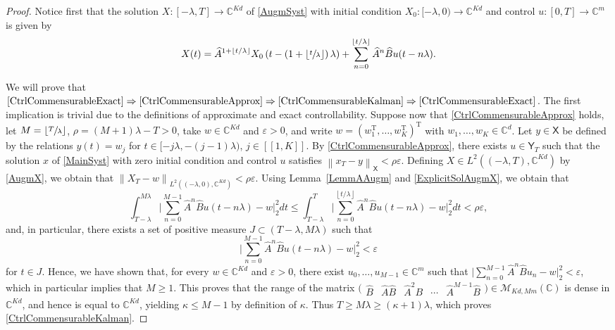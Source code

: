 \documentclass[JEP,XML,SOM,Unicode]{cedram}
\newcommand\implique{\mathchoice{\Longrightarrow}{\Rightarrow}{\Rightarrow}{\Rightarrow}}
\newcommand{\llbracket}{[\![}
\newcommand{\rrbracket}{]\!]}
\theoremstyle{plain}
\theoremstyle{definition}
\newcommand{\transp}{{\scriptscriptstyle\mathrm{T}}}
\newcommand{\norm}[1]{\left\lVert #1\right\lVert}
\newcommand{\floor}[1]{\left\lfloor #1 \right\rfloor}
\newcommand{\babs}[1]{\bigl\lvert #1\bigr \rvert}
\newcommand{\bgabs}[1]{\biggl\lvert #1\biggr \rvert}
\begin{document}
\begin{proof}
Notice first that the solution $X: [-\lambda, T] \to \mathbb C^{Kd}$ of \eqref{AugmSyst} with initial condition $X_0: [-\lambda, 0) \to \mathbb C^{Kd}$ and control $u: [0, T] \to \mathbb C^m$ is given by
\begin{equation}
\label{ExplicitSolAugmX}
X(t) = \widehat A^{1 + \floor{t/\lambda}} X_0\left(t - \left(1 + \floor{\sfrac{t}{\lambda}}\right) \lambda\right) + \sum_{n=0}^{\floor{t/\lambda}} \widehat A^n \widehat B u(t - n\lambda).
\end{equation}

We will prove that $\eqref{CtrlCommensurableExact}\implique \eqref{CtrlCommensurableApprox}\implique \eqref{CtrlCommensurableKalman}\implique\eqref{CtrlCommensurableExact}$. The first implication is trivial due to the definitions of approximate and exact controllability. Suppose now that \eqref{CtrlCommensurableApprox} holds, let $M = \floor{\sfrac{T}{\lambda}}$, $\rho = (M+1)\lambda - T > 0$, take $w \in \mathbb C^{Kd}$ and $\varepsilon > 0$, and write $w = \left(w_1^\transp, \dots, w_K^\transp\right)^\transp$ with $w_1, \dots, w_K \in \mathbb C^d$. Let $y \in \mathsf X$ be defined by the relations $y(t) = w_j$ for $t \in [-j\lambda, -(j-1)\lambda)$, $j \in \llbracket 1, K\rrbracket$. By \eqref{CtrlCommensurableApprox}, there exists $u \in \mathsf Y_T$ such that the solution $x$ of \eqref{MainSyst} with zero initial condition and control $u$ satisfies $\norm{x_T - y}_{\mathsf X} < \rho\varepsilon$. Defining $X \in L^2((-\lambda, T), \mathbb C^{Kd})$ by \eqref{AugmX}, we obtain that $\norm{X_T - w}_{L^2((-\lambda, 0), \mathbb C^{Kd})} < \rho\varepsilon$. Using Lemma~\ref{LemmAAugm} and \eqref{ExplicitSolAugmX}, we obtain that
\[
\int_{T - \lambda}^{M\lambda} \bgabs{\sum_{n=0}^{M-1} \widehat A^n \widehat B u(t - n\lambda) - w}_{2}^2 dt \leq \int_{T - \lambda}^T \bgabs{\sum_{n=0}^{\floor{t/\lambda}} \widehat A^n \widehat B u(t - n\lambda) - w}_{2}^2 dt < \rho\varepsilon,
\]
and, in particular, there exists a set of positive measure $J \subset (T - \lambda, M\lambda)$ such that
\[
\bgabs{\sum_{n=0}^{M-1} \widehat A^n \widehat B u(t - n\lambda) - w}_{2}^2 < \varepsilon
\]
for $t \in J$. Hence, we have shown that, for every $w \in \mathbb C^{K d}$ and $\varepsilon > 0$, there exist $u_0, \dots, u_{M-1} \in \mathbb C^m$ such that $\babs{\sum_{n=0}^{M-1} \widehat A^n \widehat B u_n - w}_2^2 < \varepsilon$, which in particular implies that $M \geq 1$. This proves that the range of the matrix $\bigl(\begin{matrix}\widehat B & \widehat A \widehat B & \widehat A^2 B & \cdots & \widehat A^{M-1} \widehat B\end{matrix}\bigr) \in \mathcal M_{Kd, M m}(\mathbb C)$ is dense in $\mathbb C^{Kd}$, and hence is equal to $\mathbb C^{Kd}$, yielding $\kappa \leq M - 1$ by definition of $\kappa$. Thus $T \geq M \lambda \geq (\kappa + 1)\lambda$, which proves \eqref{CtrlCommensurableKalman}.


\end{proof}
\end{document}
